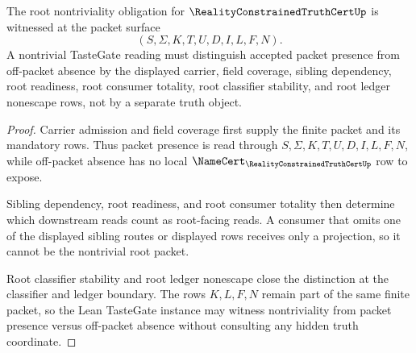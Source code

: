 \begin{theorem}
\label{thm:reality-constrained-truth-cert-root-nontrivial-readiness}
The root nontriviality obligation for $\RealityConstrainedTruthCertUp$ is
witnessed at the packet surface
$$
(S,\Sigma,K,T,U,D,I,L,F,N).
$$
A nontrivial TasteGate reading must distinguish accepted packet presence from
off-packet absence by the displayed carrier, field coverage, sibling
dependency, root readiness, root consumer totality, root classifier stability,
and root ledger nonescape rows, not by a separate truth object.
\end{theorem}
\begin{proof}
Carrier admission and field coverage first supply the finite packet and its
mandatory rows. Thus packet presence is read through
$S,\Sigma,K,T,U,D,I,L,F,N$, while off-packet absence has no local
$\NameCert_{\RealityConstrainedTruthCertUp}$ row to expose.

Sibling dependency, root readiness, and root consumer totality then determine
which downstream reads count as root-facing reads. A consumer that omits one
of the displayed sibling routes or displayed rows receives only a projection,
so it cannot be the nontrivial root packet.

Root classifier stability and root ledger nonescape close the distinction at
the classifier and ledger boundary. The rows $K,L,F,N$ remain part of the same
finite packet, so the Lean TasteGate instance may witness nontriviality from
packet presence versus off-packet absence without consulting any hidden truth
coordinate.
\end{proof}

